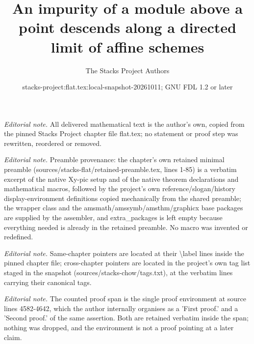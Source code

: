\documentclass[10pt,a4paper]{amsart}
\title{An impurity of a module above a point descends along a directed limit of affine schemes}
\author{The Stacks Project Authors}
\date{stacks-project:flat.tex:local-snapshot-20261011; GNU FDL 1.2 or later}
\theoremstyle{plain}
\theoremstyle{definition}
\theoremstyle{remark}
\numberwithin{equation}{subsection}
\begin{document}
\maketitle
\noindent\textit{Editorial note.} All delivered mathematical text is the author's own, copied from the pinned Stacks Project chapter file flat.tex; no statement or proof step was rewritten, reordered or removed.\par\medskip
\noindent\textit{Editorial note.} Preamble provenance: the chapter's own retained minimal preamble (sources/stacks-flat/retained-preamble.tex, lines 1-85) is a verbatim excerpt of the native Xy-pic setup and of the native theorem declarations and mathematical macros, followed by the project's own reference/slogan/history display-environment definitions copied mechanically from the shared preamble; the wrapper class and the amsmath/amssymb/amsthm/graphicx base packages are supplied by the assembler, and extra\_packages is left empty because everything needed is already in the retained preamble. No macro was invented or redefined.\par\medskip
\noindent\textit{Editorial note.} Same-chapter pointers are located at their \textbackslash{}label lines inside the pinned chapter file; cross-chapter pointers are located in the project's own tag list staged in the snapshot (sources/stacks-chow/tags.txt), at the verbatim lines carrying their canonical tags.\par\medskip
\noindent\textit{Editorial note.} The counted proof span is the single proof environment at source lines 4582-4642, which the author internally organises as a 'First proof.' and a 'Second proof.' of the same assertion. Both are retained verbatim inside the span; nothing was dropped, and the environment is not a proof pointing at a later claim.\par\medskip
\end{document}
